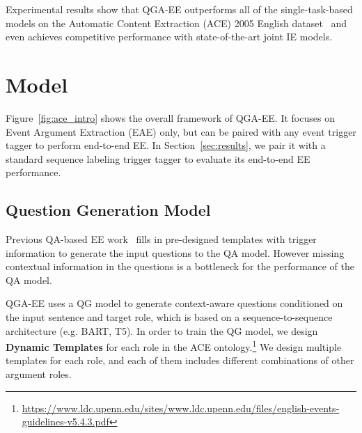 Experimental results show that QGA-EE outperforms all of the single-task-based models on the Automatic Content Extraction (ACE) 2005 English dataset~\cite{doddington2004automatic} and even achieves competitive performance with state-of-the-art joint IE models.

     

     
    
    

\section{Model}
Figure~\ref{fig:ace_intro} shows the overall framework of QGA-EE.
It focuses on Event Argument Extraction (EAE) only, but can be paired with any event trigger tagger to perform end-to-end EE. In Section~\ref{sec:results}, we pair it with a standard sequence labeling trigger tagger to evaluate its end-to-end EE performance. 

\subsection{Question Generation Model}

Previous QA-based EE work~\cite{du2020event} fills in pre-designed templates with trigger information to generate the input questions to the QA model. However missing contextual information in the questions is a bottleneck for the performance of the QA model.

QGA-EE uses a QG model to generate context-aware questions conditioned on the input sentence and target role, which is based on a sequence-to-sequence architecture (e.g. BART\cite{lewis2019bart}, T5\cite{roberts2019exploring}). In order to train the QG model, we design \textbf{Dynamic Templates} for each role in the ACE ontology.\footnote{\url{https://www.ldc.upenn.edu/sites/www.ldc.upenn.edu/files/english-events-guidelines-v5.4.3.pdf}} We design multiple templates for each role, and each of them includes different combinations of other argument roles.

